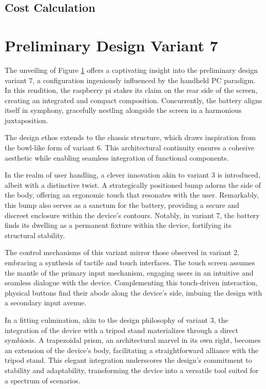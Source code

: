\subsection{Cost Calculation}


\section{Preliminary Design Variant 7}

The unveiling of Figure \ref{} offers a captivating insight into the preliminary design variant 7, a configuration ingeniously influenced by the handheld PC paradigm. In this rendition, the raspberry pi stakes its claim on the rear side of the screen, creating an integrated and compact composition. Concurrently, the battery aligns itself in symphony, gracefully nestling alongside the screen in a harmonious juxtaposition.

The design ethos extends to the chassis structure, which draws inspiration from the bowl-like form of variant 6. This architectural continuity ensures a cohesive aesthetic while enabling seamless integration of functional components.

In the realm of user handling, a clever innovation akin to variant 3 is introduced, albeit with a distinctive twist. A strategically positioned bump adorns the side of the body, offering an ergonomic touch that resonates with the user. Remarkably, this bump also serves as a sanctum for the battery, providing a secure and discreet enclosure within the device's contours. Notably, in variant 7, the battery finds its dwelling as a permanent fixture within the device, fortifying its structural stability.

The control mechanisms of this variant mirror those observed in variant 2, embracing a synthesis of tactile and touch interfaces. The touch screen assumes the mantle of the primary input mechanism, engaging users in an intuitive and seamless dialogue with the device. Complementing this touch-driven interaction, physical buttons find their abode along the device's side, imbuing the design with a secondary input avenue.

In a fitting culmination, akin to the design philosophy of variant 3, the integration of the device with a tripod stand materializes through a direct symbiosis. A trapezoidal prism, an architectural marvel in its own right, becomes an extension of the device's body, facilitating a straightforward alliance with the tripod stand. This elegant integration underscores the design's commitment to stability and adaptability, transforming the device into a versatile tool suited for a spectrum of scenarios.





